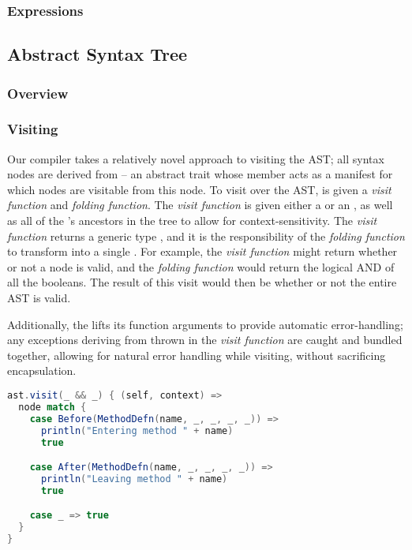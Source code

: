 \documentclass{article}
\begin{document}
\subsubsection{Expressions}


\subsection{Abstract Syntax Tree}

\subsubsection{Overview}

\subsubsection{Visiting}

Our compiler takes a relatively novel approach to visiting the AST; all syntax nodes are derived from 
-- an abstract trait whose \value{children} member acts as a manifest for which nodes are visitable from this node. To
visit over the AST,  is given a \textit{visit function} and \textit{folding function}. The \textit{visit
function} is given either a \value{Before(Node)} or an \value{After(Node)}, as well as all of the \value{Node}'s
ancestors in the tree to allow for context-sensitivity. The \textit{visit function} returns a generic type ,
and it is the responsibility of the \textit{folding function} to transform  into a single . For
example, the \textit{visit function} might return whether or not a node is valid, and the \textit{folding function}
would return the logical AND of all the booleans. The result of this visit would then be whether or not the entire AST
is valid.

Additionally, the \value{Visitor} lifts its function arguments to provide automatic error-handling; any exceptions
deriving from  thrown in the \textit{visit function} are caught and bundled together, allowing for
natural error handling while visiting, without sacrificing encapsulation.


\begin{lstlisting}[language=Scala]
ast.visit(_ && _) { (self, context) =>
  node match {
    case Before(MethodDefn(name, _, _, _, _)) =>
      println("Entering method " + name)
      true

    case After(MethodDefn(name, _, _, _, _)) =>
      println("Leaving method " + name)
      true

    case _ => true
  }
}


\end{lstlisting}
\end{document}
